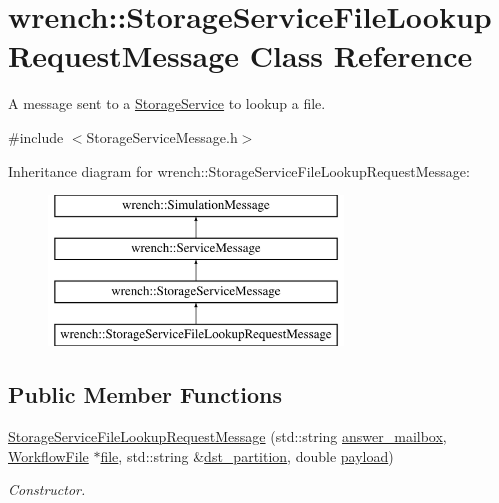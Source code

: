 \hypertarget{classwrench_1_1_storage_service_file_lookup_request_message}{}\section{wrench\+:\+:Storage\+Service\+File\+Lookup\+Request\+Message Class Reference}
\label{classwrench_1_1_storage_service_file_lookup_request_message}


A message sent to a \hyperlink{classwrench_1_1_storage_service}{Storage\+Service} to lookup a file.  




{\ttfamily \#include $<$Storage\+Service\+Message.\+h$>$}

Inheritance diagram for wrench\+:\+:Storage\+Service\+File\+Lookup\+Request\+Message\+:\begin{figure}[H]
\begin{center}
\leavevmode
\includegraphics[height=4.000000cm]{classwrench_1_1_storage_service_file_lookup_request_message}
\end{center}
\end{figure}
\subsection*{Public Member Functions}
\begin{DoxyCompactItemize}
\item 
\hyperlink{classwrench_1_1_storage_service_file_lookup_request_message_ac998ebd2b7bb1ee3e6c487feba7e415b}{Storage\+Service\+File\+Lookup\+Request\+Message} (std\+::string \hyperlink{classwrench_1_1_storage_service_file_lookup_request_message_a84ed995c526f3e1f78841a05ace2d0ff}{answer\+\_\+mailbox}, \hyperlink{classwrench_1_1_workflow_file}{Workflow\+File} $\ast$\hyperlink{classwrench_1_1_storage_service_file_lookup_request_message_ad18495c6e35aec1ae6a28edf7e0d881d}{file}, std\+::string \&\hyperlink{classwrench_1_1_storage_service_file_lookup_request_message_a8ef342162da4740e29af692891bf47a8}{dst\+\_\+partition}, double \hyperlink{classwrench_1_1_simulation_message_a914f2732713f7c02898e66f05a7cb8a1}{payload})
\begin{DoxyCompactList}\small\item\em Constructor. \end{DoxyCompactList}\end{DoxyCompactItemize}
